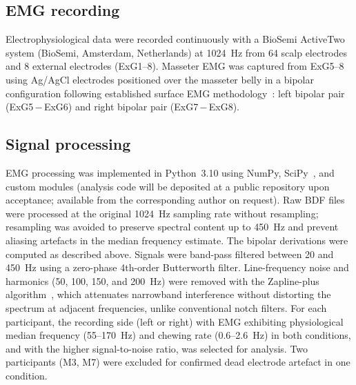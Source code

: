 \subsection*{EMG recording}

Electrophysiological data were recorded continuously with a BioSemi ActiveTwo
system (BioSemi, Amsterdam, Netherlands) at 1024~Hz from 64 scalp electrodes
and 8 external electrodes (ExG1--8).
Masseter EMG was captured from ExG5--8 using Ag/AgCl electrodes positioned over
the masseter belly in a bipolar configuration following established surface EMG
methodology~\cite{deLuca1997}:
left bipolar pair (ExG5\,$-$\,ExG6) and right bipolar pair (ExG7\,$-$\,ExG8).

\subsection*{Signal processing}

EMG processing was implemented in Python~3.10 using NumPy, SciPy~\cite{SciPy2020},
and custom modules (analysis code will be deposited at a public repository
upon acceptance; available from the corresponding author on request).
Raw BDF files were processed at the original 1024~Hz sampling rate without
resampling; resampling was avoided to preserve spectral content up to 450~Hz and
prevent aliasing artefacts in the median frequency estimate.
The bipolar derivations were computed as described above.
Signals were band-pass filtered between 20 and 450~Hz using a zero-phase
4th-order Butterworth filter.
Line-frequency noise and harmonics (50, 100, 150, and 200~Hz) were removed with
the Zapline-plus algorithm~\cite{Pyzaplineplus}, which attenuates narrowband
interference without distorting the spectrum at adjacent frequencies, unlike
conventional notch filters.
For each participant, the recording side (left or right) with EMG exhibiting
physiological median frequency (55--170~Hz) and chewing rate (0.6--2.6~Hz)
in both conditions, and with the higher signal-to-noise ratio, was selected for
analysis.
Two participants (M3, M7) were excluded for confirmed dead electrode
artefact in one condition.

